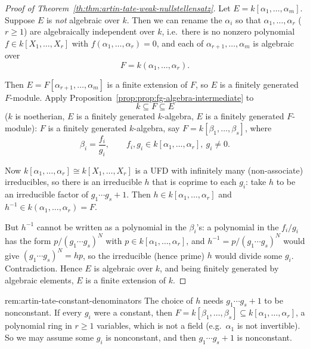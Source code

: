 \begin{proof}[Proof of Theorem~\ref{th:thm:artin-tate-weak-nullstellensatz}]
Let $E = k[\alpha_1, \ldots, \alpha_m]$. Suppose $E$ is \emph{not} algebraic over $k$. Then we can rename the $\alpha_i$ so that $\alpha_1, \ldots, \alpha_r$ ($r \geq 1$) are algebraically independent over $k$, i.e.\ there is no nonzero polynomial $f \in k[X_1, \ldots, X_r]$ with $f(\alpha_1, \ldots, \alpha_r) = 0$, and each of $\alpha_{r+1}, \ldots, \alpha_m$ is algebraic over
\[
F = k(\alpha_1, \ldots, \alpha_r).
\]

Then $E = F[\alpha_{r+1}, \ldots, \alpha_m]$ is a finite extension of $F$, so $E$ is a finitely generated $F$-module. Apply Proposition~\ref{prop:prop:fg-algebra-intermediate} to
\[
k \subseteq F \subseteq E
\]
($k$ is noetherian, $E$ is a finitely generated $k$-algebra, $E$ is a finitely generated $F$-module): $F$ is a finitely generated $k$-algebra, say $F = k[\beta_1, \ldots, \beta_s]$, where
\[
\beta_i = \frac{f_i}{g_i}, \qquad f_i, g_i \in k[\alpha_1, \ldots, \alpha_r],\ g_i \neq 0.
\]

Now $k[\alpha_1, \ldots, \alpha_r] \cong k[X_1, \ldots, X_r]$ is a UFD with infinitely many (non-associate) irreducibles, so there is an irreducible $h$ that is coprime to each $g_i$: take $h$ to be an irreducible factor of $g_1 \cdots g_s + 1$. Then $h \in k[\alpha_1, \ldots, \alpha_r]$ and $h^{-1} \in k(\alpha_1, \ldots, \alpha_r) = F$.

But $h^{-1}$ cannot be written as a polynomial in the $\beta_i$'s: a polynomial in the $f_i/g_i$ has the form $p/(g_1\cdots g_s)^N$ with $p \in k[\alpha_1, \ldots, \alpha_r]$, and $h^{-1} = p/(g_1\cdots g_s)^N$ would give $(g_1 \cdots g_s)^N = hp$, so the irreducible (hence prime) $h$ would divide some $g_i$. Contradiction. Hence $E$ is algebraic over $k$, and being finitely generated by algebraic elements, $E$ is a finite extension of $k$.
\end{proof}

\begin{remark}{}{rem:artin-tate-constant-denominators}
The choice of $h$ needs $g_1\cdots g_s + 1$ to be nonconstant. If every $g_i$ were a constant, then $F = k[\beta_1,\ldots,\beta_s] \subseteq k[\alpha_1, \ldots, \alpha_r]$, a polynomial ring in $r \geq 1$ variables, which is not a field (e.g.\ $\alpha_1$ is not invertible). So we may assume some $g_i$ is nonconstant, and then $g_1\cdots g_s + 1$ is nonconstant.
\end{remark}